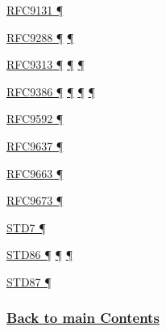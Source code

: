 \documentclass[
]{article}
\begin{document}
\hyperref[address-resolution]{RFC9131 ¶}

\hyperref[extension-headers-and-options]{RFC9288 ¶}
\hyperref[filtering]{¶}

\hyperref[coexistence-with-legacy-ipv4]{RFC9313 ¶}
\hyperref[dual-stack-scenarios]{¶}
\hyperref[translation-and-ipv4-as-a-service]{¶}

\hyperref[dual-stack-scenarios]{RFC9386 ¶}
\hyperref[deployment-by-carriers]{¶}
\hyperref[deployment-in-the-enterprise]{¶} \hyperref[status]{¶}

\hyperref[addresses]{RFC9592 ¶}

\hyperref[addresses]{RFC9637 ¶}

\hyperref[prefix-per-host]{RFC9663 ¶}

\hyperref[extension-headers-and-options]{RFC9673 ¶}

\hyperref[transport-protocols]{STD7 ¶}

\hyperref[ipv6-basic-technology]{STD86 ¶}
\hyperref[extension-headers-and-options]{¶} \hyperref[markdown-usage]{¶}

\hyperref[extension-headers-and-options]{STD87 ¶}

\subsubsection{\texorpdfstring{\hyperref[list-of-contents]{Back to main
Contents}}{Back to main Contents}}\label{back-to-main-contents-13}

\pagebreak
\end{document}
